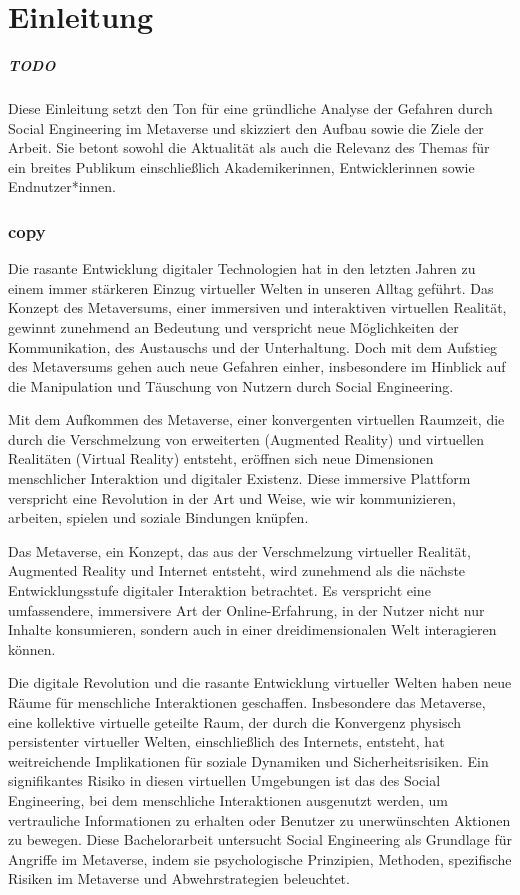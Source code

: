 \chapter{Einleitung}\label{ch:Einleitung}

\paragraph*{TODO}
Diese Einleitung setzt den Ton für eine gründliche Analyse der Gefahren durch Social Engineering im Metaverse und skizziert den Aufbau sowie die Ziele der Arbeit. Sie betont sowohl die Aktualität als auch die Relevanz des Themas für ein breites Publikum einschließlich Akademikerinnen, Entwicklerinnen sowie Endnutzer*innen.

\subsection*{copy}

Die rasante Entwicklung digitaler Technologien hat in den letzten Jahren zu einem immer stärkeren Einzug virtueller Welten in unseren Alltag geführt. Das Konzept des Metaversums, einer immersiven und interaktiven virtuellen Realität, gewinnt zunehmend an Bedeutung und verspricht neue Möglichkeiten der Kommunikation, des Austauschs und der Unterhaltung. Doch mit dem Aufstieg des Metaversums gehen auch neue Gefahren einher, insbesondere im Hinblick auf die Manipulation und Täuschung von Nutzern durch Social Engineering.



Mit dem Aufkommen des Metaverse, einer konvergenten virtuellen Raumzeit, die durch die Verschmelzung von erweiterten (Augmented Reality) und virtuellen Realitäten (Virtual Reality) entsteht, eröffnen sich neue Dimensionen menschlicher Interaktion und digitaler Existenz. Diese immersive Plattform verspricht eine Revolution in der Art und Weise, wie wir kommunizieren, arbeiten, spielen und soziale Bindungen knüpfen. 

Das Metaverse, ein Konzept, das aus der Verschmelzung virtueller Realität, Augmented Reality und Internet entsteht, wird zunehmend als die nächste Entwicklungsstufe digitaler Interaktion betrachtet. Es verspricht eine umfassendere, immersivere Art der Online-Erfahrung, in der Nutzer nicht nur Inhalte konsumieren, sondern auch in einer dreidimensionalen Welt interagieren können.


Die digitale Revolution und die rasante Entwicklung virtueller Welten haben neue Räume für menschliche Interaktionen geschaffen. Insbesondere das Metaverse, eine kollektive virtuelle geteilte Raum, der durch die Konvergenz physisch persistenter virtueller Welten, einschließlich des Internets, entsteht, hat weitreichende Implikationen für soziale Dynamiken und Sicherheitsrisiken. Ein signifikantes Risiko in diesen virtuellen Umgebungen ist das des Social Engineering, bei dem menschliche Interaktionen ausgenutzt werden, um vertrauliche Informationen zu erhalten oder Benutzer zu unerwünschten Aktionen zu bewegen. Diese Bachelorarbeit untersucht Social Engineering als Grundlage für Angriffe im Metaverse, indem sie psychologische Prinzipien, Methoden, spezifische Risiken im Metaverse und Abwehrstrategien beleuchtet.


